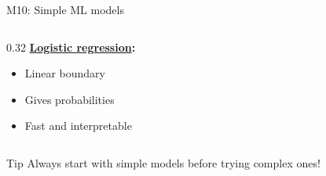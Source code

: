 \documentclass[aspectratio=169, 10pt]{beamer}
\begin{document}
\begin{frame}{M10: Simple ML models}
\begin{columns}
        \begin{column}{0.32\textwidth}
            \textbf{\href{https://en.wikipedia.org/wiki/Logistic_regression}{Logistic regression}:}
            \begin{itemize}
                \item Linear boundary
                \item Gives probabilities
                \item Fast and interpretable
            \end{itemize}
            \begin{center}
            \end{center}
        \end{column}
    \end{columns}
    
    \vspace{5mm}
    
    \begin{block}{Tip}
        Always start with simple models before trying complex ones!
    \end{block}
    
\end{frame}
\end{document}
